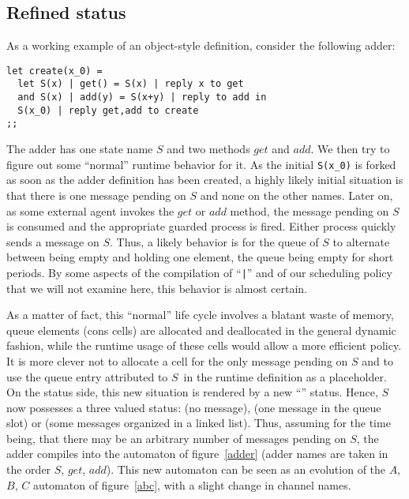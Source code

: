 \subsection{Refined status}
As a working example of an object-style definition, consider the
following adder:
\begin{verbatim}
let create(x_0) =
  let S(x) | get() = S(x) | reply x to get
  and S(x) | add(y) = S(x+y) | reply to add in
  S(x_0) | reply get,add to create
;;
\end{verbatim}

The adder has one state name $S$ and two methods $get$ and $add$.  We
then try to figure out some ``normal'' runtime behavior for it.  As
the initial \verb+S(x_0)+ is forked as soon as the adder definition
has been created, a highly likely initial situation is that there is
one message pending on $S$ and none on the other names.  Later on,
as some external agent invokes the $get$ or $add$ method, the message
pending on $S$ is consumed and the appropriate guarded process is
fired.  Either process quickly sends a message on $S$.  Thus, a likely
behavior is for the queue of $S$ to alternate between being empty and
holding one element, the queue being empty for short periods.  By some
aspects of the compilation of ``\verb+|+'' and of our scheduling
policy that we will not examine here, this behavior is almost certain.

As a matter of fact, this ``normal'' life cycle involves a blatant
waste of memory, queue elements (cons cells) are allocated and
deallocated in the general dynamic fashion, while the runtime usage of
these cells would allow a more efficient policy.  It is more clever
not to allocate a cell for the only message pending on $S$ and to use
the queue entry attributed to $S$~in the runtime definition as a
placeholder.  On the status side, this new situation is rendered by a
new ``'' status.  Hence, $S$ now possesses a three valued
status:  (no message),  (one message in the queue
slot) or  (some messages organized in a linked list).  Thus,
assuming for the time being, that there may be an arbitrary number of
messages pending on $S$, the adder compiles into the automaton of
figure~\ref{adder} (adder names are taken in the order $S$, $get$,
$add$). This new automaton can be seen as an evolution of the $A$,
$B$, $C$ automaton of figure~\ref{abc}, with a slight change in
channel names.

